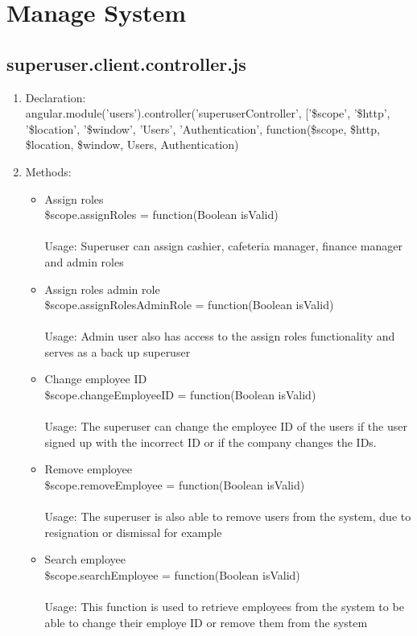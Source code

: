 \documentclass[a4paper,12pt]{report}
\begin{document}
\section{Manage System}
\subsection{superuser.client.controller.js}
\begin{enumerate}
\item Declaration: \\ angular.module('users').controller('superuserController', ['\$scope', '\$http', '\$location', '\$window', 'Users', 'Authentication',
	function(\$scope, \$http, \$location, \$window, Users, Authentication) 
\item Methods: 
	\begin{itemize}
		\item Assign roles \\ \$scope.assignRoles = function(Boolean isValid)  \\ \\
		Usage: Superuser can assign cashier, cafeteria manager, finance manager and admin roles
		\item Assign roles admin role \\ \$scope.assignRolesAdminRole = function(Boolean isValid)   \\ \\
		Usage: Admin user also has access to the assign roles functionality and serves as a back up superuser
		\item Change employee ID \\ \$scope.changeEmployeeID = function(Boolean isValid)  \\ \\
		Usage: The superuser can change the employee ID of the users if the user signed up with the incorrect ID or if the company changes the IDs.
		\item Remove employee \\ \$scope.removeEmployee = function(Boolean isValid)  
		\\ \\ Usage: The superuser is also able to remove users from the system, due to resignation or dismissal for example
		\item Search employee \\ \$scope.searchEmployee = function(Boolean isValid) 
		\\ \\ Usage: This function is used to retrieve employees from the system to be able to change their employe ID or remove them from the system

\end{itemize}
\end{enumerate}
\end{document}
